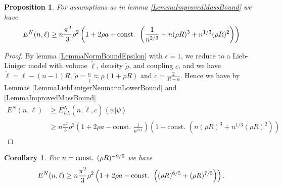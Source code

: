\documentclass[a4paper,11pt]{article}
\renewcommand{\braket}[1]{\left\langle#1\right\rangle}
\newtheorem{proposition}{Proposition}
\newtheorem{corollary}{Corollary}
\numberwithin{equation}{section}
\begin{document}
	\begin{proposition}\label{PropositionLowerBoundSpecN}
		For assumptions as in lemma \ref{LemmaImprovedMassBound} we have \begin{equation}
		E^N(n,\ell)\geq n\frac{\pi^2}{3}\rho^2\left(1+2\rho a+\textnormal{const. }\left(\frac{1}{n^{2/3}}+n(\rho R)^3+n^{1/3}(\rho R)^2\right)\right)
		\end{equation}
	\end{proposition}
	\begin{proof}
		By lemma \ref{LemmaNormBoundEpsilon} with $ \epsilon=1 $, we reduce to a Lieb-Liniger model with volume $ \tilde{\ell} $, density $ \tilde{\rho} $, and coupling $ c $, and we have $ \tilde{\ell}=\ell-(n-1)R $, $ \tilde{\rho}=\frac{n}{\tilde{\ell}}\approx\rho (1+\rho R) $ and $ c=\frac{2}{R-a} $. Hence we have by Lemmas \ref{LemmaLiebLinigerNeumannLowerBound} and \ref{LemmaImprovedMassBound} \begin{equation}
		\begin{aligned}
		E^N(n,\ell)&\geq E_{LL}^N(n,\tilde{\ell},c)\braket{\psi|\psi}\\&\geq
		n\frac{\pi^2}{3}\rho^2\left(1+2\rho a-\text{const. }\frac{1}{n^{2/3}}\right)\left(1-\text{const. }\left(n(\rho R)^3+n^{1/3}(\rho R)^2\right)\right)
		\end{aligned}
		\end{equation}
	\end{proof}
	\begin{corollary} \label{CorollaryLowerBoundSpecN}
		For $ n=\textnormal{const. } (\rho R)^{-9/5} $ we have 
		\begin{equation}
		E^N(n,\ell)\geq n\frac{\pi^2}{3}\rho^2\left(1+2\rho a-\textnormal{const. }\left((\rho R)^{6/5}+(\rho R)^{7/5}\right)\right).
		\end{equation}
	\end{corollary}
\end{document}
